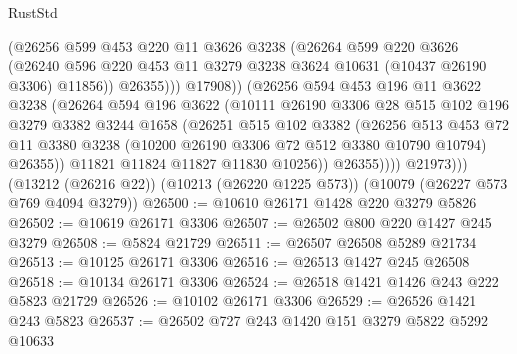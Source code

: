 \begin{lexlean}{RustStd}
\begin{coremodule}
{\begin{coremodule}
{{{{{{{{{{{{{{{{{{{{{{{{{{                        (@26256
                          @599
                          @453
                          @220
                          @11
                          @3626
                          @3238
                          (@26264
                            @599
                            @220
                            @3626
                            (@26240
                              @596
                              @220
                              @453
                              @11
                              @3279
                              @3238
                              @3624
                              @10631
                              (@10437 @26190 @3306)
                              @11856))
                          @26355)))
                    @17908))
                (@26256
                  @594
                  @453
                  @196
                  @11
                  @3622
                  @3238
                  (@26264
                    @594
                    @196
                    @3622
                    (@10111
                      @26190
                      @3306
                      @28
                      @515
                      @102
                      @196
                      @3279
                      @3382
                      @3244
                      @1658
                      (@26251
                        @515
                        @102
                        @3382
                        (@26256
                          @513
                          @453
                          @72
                          @11
                          @3380
                          @3238
                          (@10200 @26190 @3306 @72 @512 @3380 @10790 @10794)
                          @26355))
                      @11821
                      @11824
                      @11827
                      @11830
                      @10256))
                  @26355))))
          @21973)))
    (@13212 (@26216 @22))
    (@10213 (@26220 @1225 @573))
    (@10079 (@26227 @573 @769 @4094 @3279))
@26500 := @10610 @26171 @1428 @220 @3279 @5826
@26502 := @10619 @26171 @3306
@26507 := @26502 @800 @220 @1427 @245 @3279
@26508 := @5824 @21729
@26511 := @26507 @26508 @5289 @21734
@26513 := @10125 @26171 @3306
@26516 := @26513 @1427 @245 @26508
@26518 := @10134 @26171 @3306
@26524 := @26518 @1421 @1426 @243 @222 @5823 @21729
@26526 := @10102 @26171 @3306
@26529 := @26526 @1421 @243 @5823
@26537 := @26502 @727 @243 @1420 @151 @3279 @5822 @5292 @10633
}}}}}}}}}}}}}}}}}}}}}}}}}}
\end{coremodule}}
\end{coremodule}
\end{lexlean}
